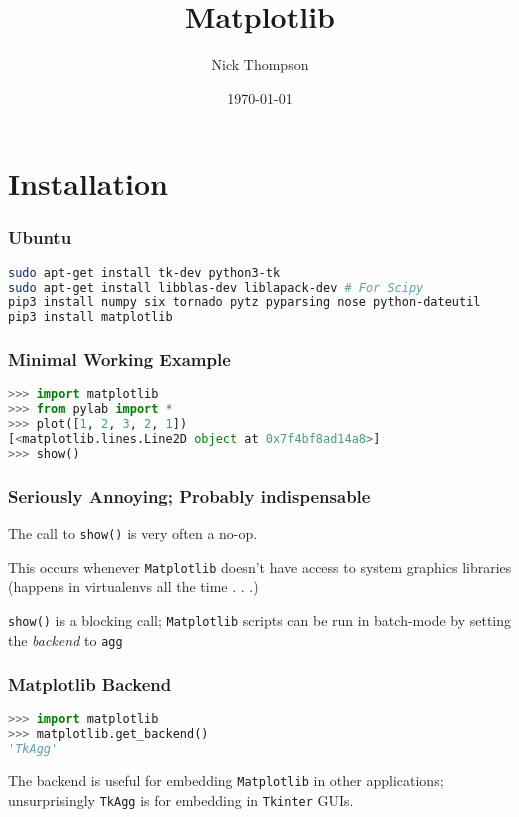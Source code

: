 \documentclass{beamer}
\begin{document}
\title{Matplotlib}
\author{Nick Thompson} 
\date{\today} 

\frame{\titlepage} 



\section{Installation} 

\begin{frame}[fragile]
\frametitle{Ubuntu}

\begin{lstlisting}[language=bash]
sudo apt-get install tk-dev python3-tk 
sudo apt-get install libblas-dev liblapack-dev # For Scipy
pip3 install numpy six tornado pytz pyparsing nose python-dateutil
pip3 install matplotlib
\end{lstlisting}
\end{frame}

\begin{frame}[fragile]
\frametitle{Minimal Working Example}
\begin{lstlisting}[language=Python]
>>> import matplotlib
>>> from pylab import *
>>> plot([1, 2, 3, 2, 1])
[<matplotlib.lines.Line2D object at 0x7f4bf8ad14a8>]
>>> show()
\end{lstlisting}
\end{frame}

\begin{frame}
\frametitle{Seriously Annoying; Probably indispensable}
The call to \texttt{show()} is very often a no-op.

This occurs whenever \texttt{Matplotlib} doesn't have access to system graphics libraries (happens in virtualenvs all the time . . .)

\texttt{show()} is a blocking call; \texttt{Matplotlib} scripts can be run in batch-mode by setting the \emph{backend} to \texttt{agg}
\end{frame}

\begin{frame}[fragile]
\frametitle{Matplotlib Backend}
\begin{lstlisting}[language=Python]
>>> import matplotlib
>>> matplotlib.get_backend()
'TkAgg'
\end{lstlisting}
The backend is useful for embedding \texttt{Matplotlib} in other applications; unsurprisingly \texttt{TkAgg} is for embedding in \texttt{Tkinter} GUIs.

\end{frame}
\end{document}
